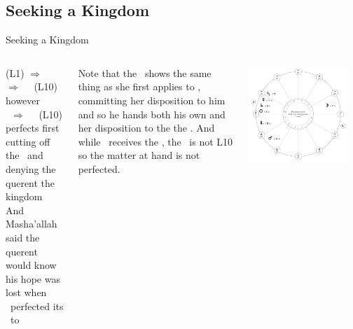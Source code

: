 \subsection{Seeking a Kingdom}
\begin{frame}[t]{Seeking a Kingdom}
\begin{columns}[T, onlytextwidth]
\Mercury\Retrograde (L1) $\Rightarrow$ \Conjunction\Sun\ $\Rightarrow$ \Sextile\ \Saturn\ (L10) \\
however \\
\Mars\ $\Rightarrow$ \Square\ \Saturn\ (L10) perfects first \\
cutting off the \Sun\ and denying the querent the kingdom \\
\vspace{0.25cm}
And Masha'allah said the querent would know his hope was lost when \Mars\ perfected its \Square\ to \Saturn \\
\vspace{0.25cm}

Note that the \Moon\ shows the same thing as she first applies to \Mercury, committing her disposition to him and so he hands both his own and her disposition to the the \Sun. And
while  \Mercury\ receives the \Sun, the \Sun\ is not L10 so the matter at hand is not perfected. \\


\begin{center}
{\includegraphics[width=0.9\textwidth]{charts/50-chart-kingdom}} \\
\end{center}
\end{columns}
\end{frame}


